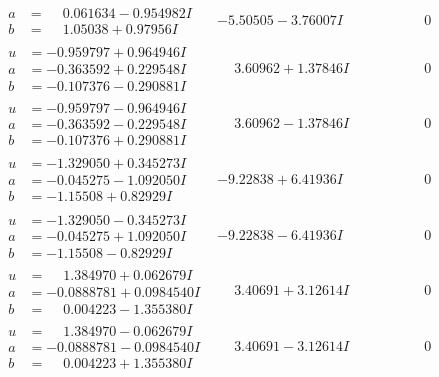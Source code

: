 \documentclass[1p]{elsarticle_modified}
\theoremstyle{definition}
\begin{document}
$$\begin{array}{c|c|c}
\begin{aligned}
a &= \phantom{-}0.061634 - 0.954982 I \\
b &= \phantom{-}1.05038 + 0.97956 I\end{aligned}
 & -5.50505 - 3.76007 I & \phantom{-0.000000 } 0 \\ \hline\begin{aligned}
u &= -0.959797 + 0.964946 I \\
a &= -0.363592 + 0.229548 I \\
b &= -0.107376 - 0.290881 I\end{aligned}
 & \phantom{-}3.60962 + 1.37846 I & \phantom{-0.000000 } 0 \\ \hline\begin{aligned}
u &= -0.959797 - 0.964946 I \\
a &= -0.363592 - 0.229548 I \\
b &= -0.107376 + 0.290881 I\end{aligned}
 & \phantom{-}3.60962 - 1.37846 I & \phantom{-0.000000 } 0 \\ \hline\begin{aligned}
u &= -1.329050 + 0.345273 I \\
a &= -0.045275 - 1.092050 I \\
b &= -1.15508 + 0.82929 I\end{aligned}
 & -9.22838 + 6.41936 I & \phantom{-0.000000 } 0 \\ \hline\begin{aligned}
u &= -1.329050 - 0.345273 I \\
a &= -0.045275 + 1.092050 I \\
b &= -1.15508 - 0.82929 I\end{aligned}
 & -9.22838 - 6.41936 I & \phantom{-0.000000 } 0 \\ \hline\begin{aligned}
u &= \phantom{-}1.384970 + 0.062679 I \\
a &= -0.0888781 + 0.0984540 I \\
b &= \phantom{-}0.004223 - 1.355380 I\end{aligned}
 & \phantom{-}3.40691 + 3.12614 I & \phantom{-0.000000 } 0 \\ \hline\begin{aligned}
u &= \phantom{-}1.384970 - 0.062679 I \\
a &= -0.0888781 - 0.0984540 I \\
b &= \phantom{-}0.004223 + 1.355380 I\end{aligned}
 & \phantom{-}3.40691 - 3.12614 I & \phantom{-0.000000 } 0\\

\end{array}$$
\end{document}
